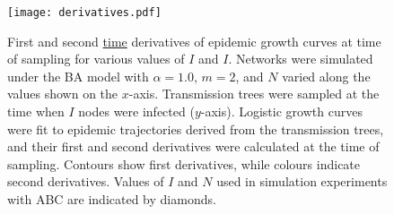 \documentclass[12pt]{article}\usepackage[]{graphicx}\usepackage[]{color}
\newcommand{\add}[1]{\color{blue} \uline{#1} \color{black}}
\begin{document}
\begin{figure}[ht]
  \centering
  \texttt{[image: derivatives.pdf]}
  \caption[
    First and second time derivatives of epidemic growth curves at time of
    sampling for various values of $I$ and $N$.
  ]{
    First and second \add{time} derivatives of epidemic growth curves at time
    of sampling for various values of $I$ and $I$. Networks were simulated
    under the BA model with $\alpha = 1.0$, $m = 2$, and $N$ varied along the
    values shown on the $x$-axis. Transmission trees were sampled at the time
    when $I$ nodes were infected ($y$-axis). Logistic growth curves were fit to
    epidemic trajectories derived from the transmission trees, and their first
    and second derivatives were calculated at the time of sampling. Contours
    show first derivatives, while colours indicate second derivatives. Values
    of $I$ and $N$ used in simulation experiments with ABC are indicated by
    diamonds.
  }
  \label{fig:derivs}
\end{figure}
\end{document}
